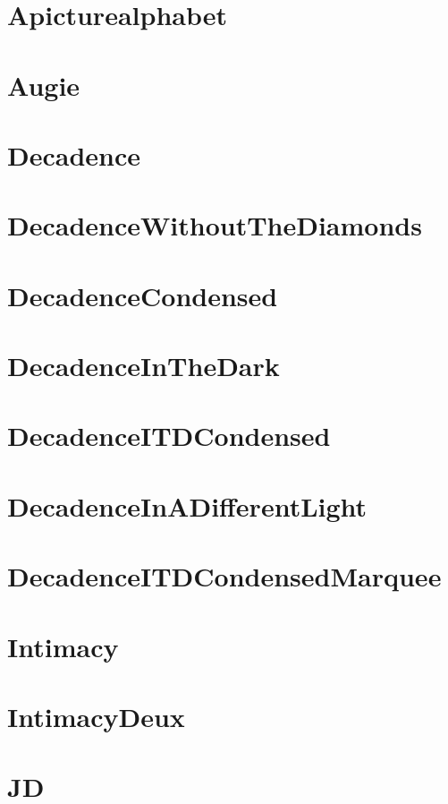 \documentclass{article}
\begin{document}
\section{Apicturealphabet}              {\ECFAPicture \lipsum[4]}
\section{Augie}                         {\ECFAugie\lipsum[4]}
\section{Decadence}                     {\ECFDecadence\lipsum[4]}
\section{DecadenceWithoutTheDiamonds}   {\ECFDecadenceWithoutTheDiamonds\lipsum[4]}
\section{DecadenceCondensed}            {\ECFDecadenceCondensed\lipsum[4]}
\section{DecadenceInTheDark}            {\ECFDecadenceInTheDark\lipsum[4]}
\section{DecadenceITDCondensed}         {\ECFDecadenceInTheDarkCondensed\lipsum[4]}
\section{DecadenceInADifferentLight}    {\ECFDecadenceInADifferentLight\lipsum[4]}
\section{DecadenceITDCondensedMarquee}  {\ECFDecadenceInTheDarkCondensedMarquee\lipsum[4]}
\section{Intimacy}                      {\ECFIntimacy\lipsum[4]}
\section{IntimacyDeux}                  {\ECFIntimacyDeux\lipsum[4]}
\section{JD}                            {\ECFJD\lipsum[4]}
\end{document}
